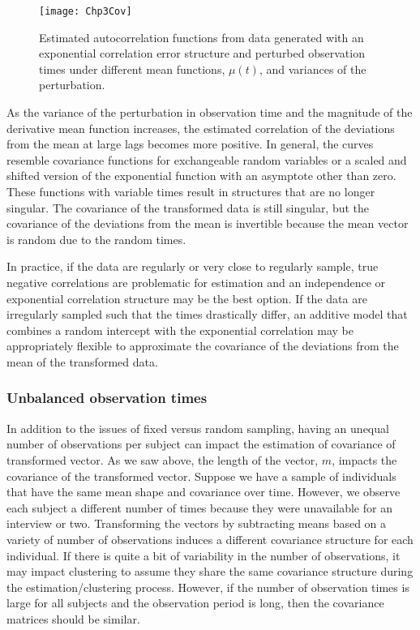 \documentclass[12pt]{article}
\begin{document}
\begin{figure}
\begin{center}
\texttt{[image: Chp3Cov]}
\end{center}
\caption{Estimated autocorrelation functions from data generated with an exponential correlation error structure and perturbed observation times under different mean functions, $\mu(t)$, and variances of the perturbation.}
\label{fig:cov}
\end{figure}

As the variance of the perturbation in observation time and the magnitude of the derivative mean function increases, the estimated correlation of the deviations from the mean at large lags becomes more positive. In general, the curves resemble covariance functions for exchangeable random variables or a scaled and shifted version of the exponential function with an asymptote other than zero. These functions with variable times result in structures that are no longer singular. The covariance of the transformed data is still singular, but the covariance of the deviations from the mean is invertible because the mean vector is random due to the random times.

In practice, if the data are regularly or very close to regularly sample, true negative correlations are problematic for estimation and an independence or exponential correlation structure may be the best option. If the data are irregularly sampled such that the times drastically differ, an additive model that combines a random intercept with the exponential correlation \cite{diggle2002} may be appropriately flexible to approximate the covariance of the deviations from the mean of the transformed data.


\subsubsection{Unbalanced observation times}
In addition to the issues of fixed versus random sampling, having an unequal number of observations per subject can impact the estimation of covariance of transformed vector. As we saw above, the length of the vector, $m$, impacts the covariance of the transformed vector. Suppose we have a sample of individuals that have the same mean shape and covariance over time. However, we observe each subject a different number of times because they were unavailable for an interview or two. Transforming the vectors by subtracting means based on a variety of number of observations induces a different covariance structure for each individual. If there is quite a bit of variability in the number of observations, it may impact clustering to assume they share the same covariance structure during the estimation/clustering process. However, if the number of observation times is large for all subjects and the observation period is long, then the covariance matrices should be similar. 
\end{document}
